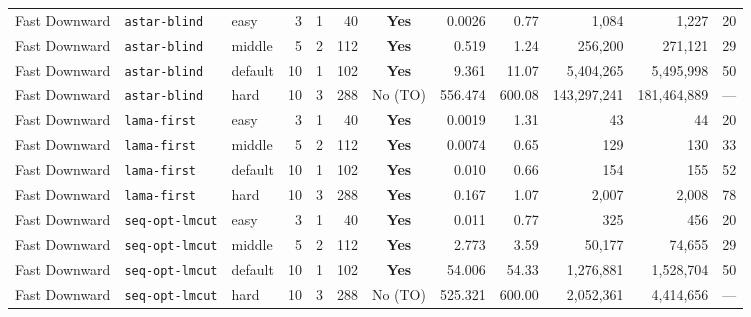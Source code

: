 \begin{table}[htbp]
{\begin{tabular}{lll rrr c rrr rr}
\midrule
Fast Downward & \texttt{astar-blind} & easy & 3 & 1 & 40 & \textbf{Yes} & 0.0026 & 0.77 & 1,084 & 1,227 & 20 \\
Fast Downward & \texttt{astar-blind} & middle & 5 & 2 & 112 & \textbf{Yes} & 0.519 & 1.24 & 256,200 & 271,121 & 29 \\
Fast Downward & \texttt{astar-blind} & default & 10 & 1 & 102 & \textbf{Yes} & 9.361 & 11.07 & 5,404,265 & 5,495,998 & 50 \\
Fast Downward & \texttt{astar-blind} & hard & 10 & 3 & 288 & No (TO) & 556.474 & 600.08 & 143,297,241 & 181,464,889 & --- \\
\midrule
Fast Downward & \texttt{lama-first} & easy & 3 & 1 & 40 & \textbf{Yes} & 0.0019 & 1.31 & 43 & 44 & 20 \\
Fast Downward & \texttt{lama-first} & middle & 5 & 2 & 112 & \textbf{Yes} & 0.0074 & 0.65 & 129 & 130 & 33 \\
Fast Downward & \texttt{lama-first} & default & 10 & 1 & 102 & \textbf{Yes} & 0.010 & 0.66 & 154 & 155 & 52 \\
Fast Downward & \texttt{lama-first} & hard & 10 & 3 & 288 & \textbf{Yes} & 0.167 & 1.07 & 2,007 & 2,008 & 78 \\
\midrule
Fast Downward & \texttt{seq-opt-lmcut} & easy & 3 & 1 & 40 & \textbf{Yes} & 0.011 & 0.77 & 325 & 456 & 20 \\
Fast Downward & \texttt{seq-opt-lmcut} & middle & 5 & 2 & 112 & \textbf{Yes} & 2.773 & 3.59 & 50,177 & 74,655 & 29 \\
Fast Downward & \texttt{seq-opt-lmcut} & default & 10 & 1 & 102 & \textbf{Yes} & 54.006 & 54.33 & 1,276,881 & 1,528,704 & 50 \\
Fast Downward & \texttt{seq-opt-lmcut} & hard & 10 & 3 & 288 & No (TO) & 525.321 & 600.00 & 2,052,361 & 4,414,656 & --- \\
\bottomrule
\end{tabular}%
}
\end{table}
